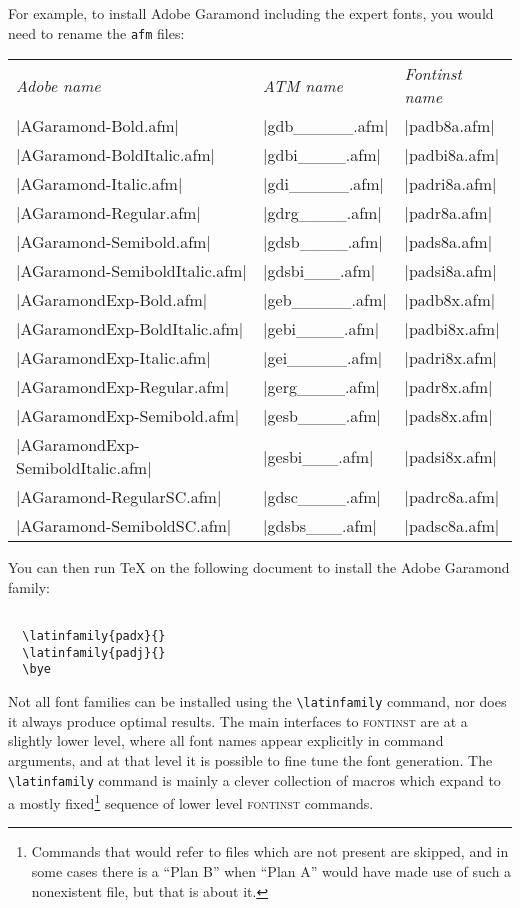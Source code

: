 \documentclass[a4paper]{ltxguide}
\newcommand*{\setfilename}[1]{\texttt{#1}}
\newcommand*{\setpackagename}[1]{\textsc{#1}}
\newcommand{\fontinst}{\setpackagename{font\-inst}\xspace}
\newcommand{\afm}{\setfilename{afm}\xspace}
\begin{document}
For example, to install Adobe Garamond including the expert fonts, you
would need to rename the \afm files:
\begin{center}
\begin{small}
\begin{tabular}{lll}
  \emph{Adobe name} & \emph{ATM name} & \emph{Fontinst name} \\
  |AGaramond-Bold.afm|              & |gdb_____.afm|    & |padb8a.afm|   \\
  |AGaramond-BoldItalic.afm|        & |gdbi____.afm|    & |padbi8a.afm|  \\
  |AGaramond-Italic.afm|            & |gdi_____.afm|    & |padri8a.afm|  \\
  |AGaramond-Regular.afm|           & |gdrg____.afm|    & |padr8a.afm|   \\
  |AGaramond-Semibold.afm|          & |gdsb____.afm|    & |pads8a.afm|   \\
  |AGaramond-SemiboldItalic.afm|    & |gdsbi___.afm|    & |padsi8a.afm|  \\
  |AGaramondExp-Bold.afm|           & |geb_____.afm|    & |padb8x.afm|   \\
  |AGaramondExp-BoldItalic.afm|     & |gebi____.afm|    & |padbi8x.afm|  \\
  |AGaramondExp-Italic.afm|         & |gei_____.afm|    & |padri8x.afm|  \\
  |AGaramondExp-Regular.afm|        & |gerg____.afm|    & |padr8x.afm|   \\
  |AGaramondExp-Semibold.afm|       & |gesb____.afm|    & |pads8x.afm|   \\
  |AGaramondExp-SemiboldItalic.afm| & |gesbi___.afm|    & |padsi8x.afm|  \\
  |AGaramond-RegularSC.afm|         & |gdsc____.afm|    & |padrc8a.afm|  \\
  |AGaramond-SemiboldSC.afm|        & |gdsbs___.afm|    & |padsc8a.afm|  \\
\end{tabular}
\end{small}
\end{center}
You can then run \TeX{} on the following document to install the
Adobe Garamond family:
\begin{verbatim}
  
  \latinfamily{padx}{}
  \latinfamily{padj}{}
  \bye
\end{verbatim}
Not all font families can be installed using the \verb|\latinfamily|
command, nor does it always produce optimal results. The main 
interfaces to \fontinst are at a slightly lower level, where all font 
names appear explicitly in command arguments, and at that level it is 
possible to fine tune the font generation. The \verb|\latinfamily| 
command is mainly a clever collection of macros which expand to a 
mostly fixed\footnote{Commands that would refer to files which are 
not present are skipped, and in some cases there is a ``Plan B'' 
when ``Plan A'' would have made use of such a nonexistent file, but 
that is about it.} sequence of lower level \fontinst commands.
\end{document}
